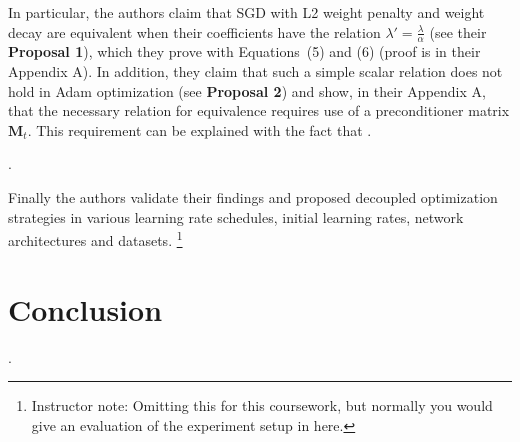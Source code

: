 \documentclass{article}
\begin{document}
In particular, the authors claim that SGD with L2 weight penalty and weight decay are equivalent when their coefficients have the relation $\lambda'=\frac{\lambda}{\alpha}$ (see their \textbf{Proposal 1}), which they prove with Equations~(5) and (6) (proof is in their Appendix A).
In addition, they claim that such a simple scalar relation does not hold in Adam optimization (see \textbf{Proposal 2}) and show, in their Appendix A, that the necessary relation for equivalence requires use of a preconditioner matrix $\bm{M}_t$.
This requirement can be explained with the fact that \questionSixteen.

\questionSeventeen.

Finally the authors validate their findings and proposed decoupled optimization strategies in various learning rate schedules, initial learning rates, network architectures and datasets. \footnote{Instructor note: Omitting this for this coursework, but normally you would give an evaluation of the experiment setup in \cite{loshchilov2019decoupled} here.}


\section{Conclusion}
\label{sec:concl}
    
\questionEighteen.

\newpage

\end{document}
